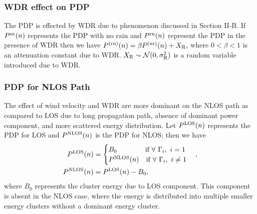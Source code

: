 \documentclass[conference]{IEEEtran}
\begin{document}


\subsubsection{WDR effect on PDP}
The PDP is effected by WDR due to phenomenon discussed in Section II-B. If $P^{\rm nr}(n)$ represents the PDP with no rain and $P^{\rm rn}(n)$ represent the PDP in the presence of WDR then we have $P^{(\rm rn)}(n) = \beta P^{(\rm nr)}(n) + X_{\rm R},$
where $0<\beta<1$  is an attenuation constant due to WDR. $X_{\rm R}\sim\mathcal{N}(0,\sigma_{\rm R}^2)$ is a random variable introduced due to WDR. %

\subsubsection{PDP for NLOS Path}
The effect of wind velocity and WDR are more dominant on the NLOS path as compared to LOS due to long propagation path, absence of dominant power component, and more scattered energy distribution. Let $P^{\rm LOS}(n)$  represents the PDP for LOS and $P^{\rm NLOS}(n)$ is the PDP for NLOS; then we have
\begin{align}
P^{\rm LOS}(n) &= 
\begin{cases}
 B_0 \ \ \ \ \ \ \ \ \ \quad \text{if } \forall \ \Gamma_{i},  \  i=1\\
P^{\rm NLOS}(n) \quad \text{if } \forall \ \Gamma_{i},  \  i\neq 1
\end{cases},\label{Eq:PDP_LOS}\\
P^{\rm NLOS}(n) &= P^{\rm LOS}(n) - B_0 ,\label{Eq:PDP_NLOS}
\end{align}
where $B_0$ represents the cluster energy due to LOS component. This component is absent in the NLOS case, where the energy is distributed into multiple smaller energy clusters without a dominant energy cluster.
\end{document}
